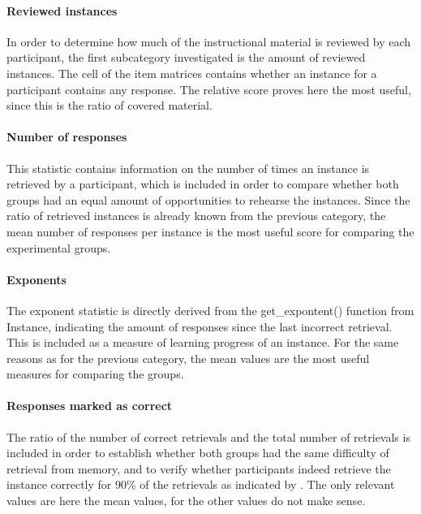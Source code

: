 \paragraph{Reviewed instances} In order to determine how much of the instructional material is reviewed by each participant, the first subcategory investigated is the amount of reviewed instances. The cell of the item matrices contains whether an instance for a participant contains any response. The relative score proves here the most useful, since this is the ratio of covered material.

\paragraph{Number of responses} This statistic contains information on the number of times an instance is retrieved by a participant, which is included in order to compare whether both groups had an equal amount of opportunities to rehearse the instances. Since the ratio of retrieved instances is already known from the previous category, the mean number of responses per instance is the most useful score for comparing the experimental groups.

\paragraph{Exponents} The exponent statistic is directly derived from the get\_expontent() function from Instance, indicating the amount of responses since the last incorrect retrieval. This is included as a measure of learning progress of an instance. For the same reasons as for the previous category, the mean values are the most useful measures for comparing the groups.

\paragraph{Responses marked as correct} The ratio of the number of correct retrievals and the total number of retrievals is included in order to establish whether both groups had the same difficulty of retrieval from memory, and to verify whether participants indeed retrieve the instance correctly for 90\% of the retrievals as indicated by . The only relevant values are here the mean values, for the other values do not make sense.

